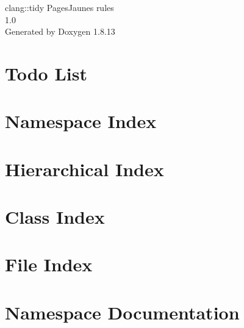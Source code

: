 \documentclass[twoside]{book}
\newcommand{\+}{\discretionary{\mbox{\scriptsize$\hookleftarrow$}}{}{}}
\newcommand{\clearemptydoublepage}{%
  \newpage{\pagestyle{empty}\cleardoublepage}%
}
\begin{document}
\hypersetup{pageanchor=false,
             bookmarksnumbered=true,
             pdfencoding=unicode
            }
\begin{titlepage}
\vspace*{7cm}
\begin{center}%
{\Large clang\+:\+:tidy Pages\+Jaunes rules \\[1ex]\large 1.\+0 }\\
\vspace*{1cm}
{\large Generated by Doxygen 1.8.13}\\
\end{center}
\end{titlepage}
\clearemptydoublepage
{}
\tableofcontents
\clearemptydoublepage
{}
\hypersetup{pageanchor=true}

\chapter{Todo List}
\label{todo}

\chapter{Namespace Index}

\chapter{Hierarchical Index}

\chapter{Class Index}

\chapter{File Index}

\chapter{Namespace Documentation}





\end{document}
